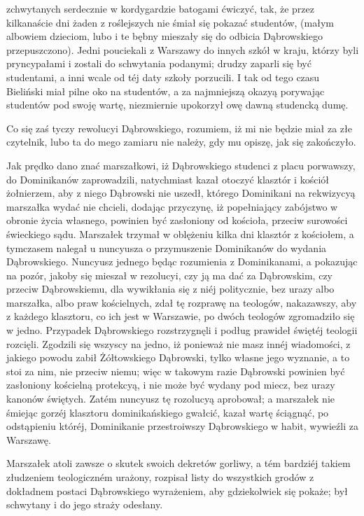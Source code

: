 \documentclass{book}
\begin{document}
zchwytanych serdecznie w kordygardzie batogami ćwiczyć, tak, że przez kilkanaście dni żaden z roślejszych nie śmiał się pokazać studentów, (małym albowiem dzieciom, lubo i te bębny mieszały się do odbicia Dąbrowskiego przepuszczono). Jedni pouciekali z Warszawy do innych szkół w kraju, którzy byli pryncypałami i zostali do schwytania podanymi; drudzy zaparli się być studentami, a inni wcale od téj daty szkoły porzucili. I tak od tego czasu Bieliński miał pilne oko na studentów, a za najmniejszą okazyą porywając studentów pod swoję wartę, niezmiernie upokorzył owę dawną studencką dumę.

Co się zaś tyczy rewolucyi Dąbrowskiego, rozumiem, iż mi nie będzie miał za złe czytelnik, lubo ta do mego zamiaru nie należy, gdy mu opiszę, jak się zakończyło.

Jak prędko dano znać marszałkowi, iż Dąbrowskiego studenci z placu porwawszy, do Dominikanów zaprowadzili, natychmiast kazał otoczyć klasztór i kościół żołnierzem, aby z niego Dąbrowski nie uszedł, którego Dominikani na rekwizycyą marszałka wydać nie chcieli, dodając przyczynę, iż popełniający zabójstwo w obronie życia własnego, powinien być zasłoniony od kościoła, przeciw surowości świeckiego sądu. Marszałek trzymał w oblężeniu kilka dni klasztór z kościołem, a tymczasem nalegał u nuncyusza o przymuszenie Dominikanów do wydania Dąbrowskiego. Nuncyusz jednego będąc rozumienia z Dominikanami, a pokazując na pozór, jakoby się mieszał w rezolucyi, czy ją ma dać za Dąbrowskim, czy przeciw Dąbrowskiemu, dla wywikłania się z niéj politycznie, bez urazy albo marszałka, albo praw kościelnych, zdał tę rozprawę na teologów, nakazawszy, aby z każdego klasztoru, co ich jest w Warszawie, po dwóch teologów zgromadziło się w jedno. Przypadek Dąbrowskiego rozstrzygnęli i podług prawideł świętéj teologii rozcięli. Zgodzili się wszyscy na jedno, iż ponieważ nie masz innéj wiadomości, z jakiego powodu zabił Żółtowskiego Dąbrowski, tylko własne jego wyznanie, a to stoi za nim, nie przeciw niemu; więc w takowym razie Dąbrowski powinien być zasłoniony kościelną protekcyą, i nie może być wydany pod miecz, bez urazy kanonów świętych. Zatém nuncyusz tę rozolucyą aprobował; a marszałek nie śmiejąc gorzéj klasztoru dominikańskiego gwałcić, kazał wartę ściągnąć, po odstąpieniu któréj, Dominikanie przestroiwszy Dąbrowskiego w habit, wywieźli za Warszawę.

Marszałek atoli zawsze o skutek swoich dekretów gorliwy, a tém bardziéj takiem złudzeniem teologiczném urażony, rozpisał listy do wszystkich grodów z dokładnem postaci Dąbrowskiego wyrażeniem, aby gdziekolwiek się pokaże; był schwytany i do jego straży odesłany.
\end{document}

